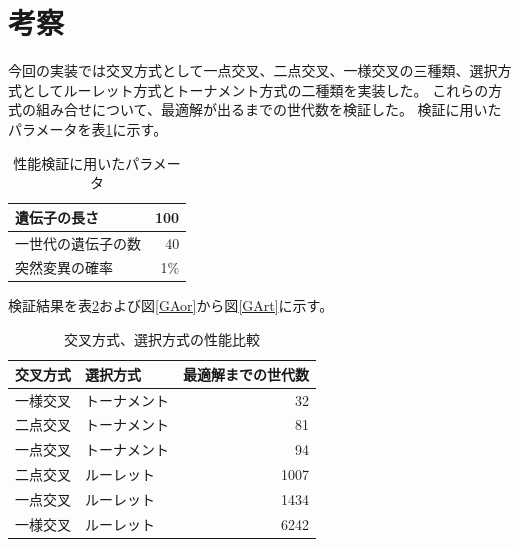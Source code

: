 \documentclass{jsarticle}
\begin{document}
\section{考察}
今回の実装では交叉方式として一点交叉、二点交叉、一様交叉の三種類、選択方式としてルーレット方式とトーナメント方式の二種類を実装した。
これらの方式の組み合せについて、最適解が出るまでの世代数を検証した。
検証に用いたパラメータを表\ref{GA_params}に示す。

\begin{table}[H]
	\caption{性能検証に用いたパラメータ\label{GA_params}}
	\begin{center}
		\begin{tabular}{|l|r|} \hline
			遺伝子の長さ & 100 \\ \hline
			一世代の遺伝子の数 & 40 \\ \hline
			突然変異の確率 & 1\% \\ \hline
		\end{tabular}
	\end{center}
\end{table}

検証結果を表\ref{GA_compare}および図\ref{GAor}から図\ref{GArt}に示す。

\begin{table}[H]
	\caption{交叉方式、選択方式の性能比較\label{GA_compare}}
	\begin{center}
		\begin{tabular}{|l|l|r|} \hline
			交叉方式 & 選択方式 & 最適解までの世代数 \\ \hline\hline
			一様交叉 & トーナメント & 32 \\ \hline
			二点交叉 & トーナメント & 81 \\ \hline
			一点交叉 & トーナメント & 94 \\ \hline
			二点交叉 & ルーレット & 1007 \\ \hline
			一点交叉 & ルーレット & 1434 \\ \hline
			一様交叉 & ルーレット & 6242 \\ \hline
		\end{tabular}
	\end{center}
\end{table}
\end{document}
